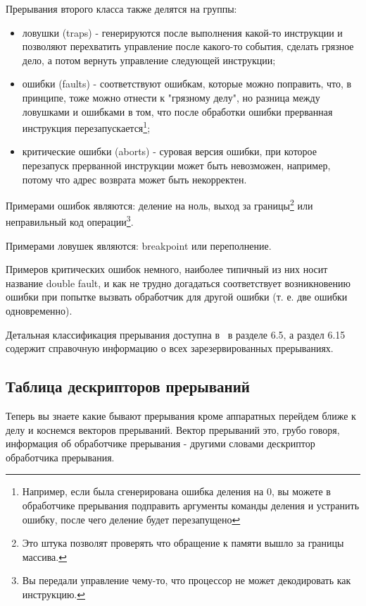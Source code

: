 Прерывания второго класса также делятся на группы:
\begin{itemize}
  \item ловушки (traps) - генерируются после выполнения какой-то инструкции и
        позволяют перехватить управление после какого-то события, сделать
        грязное дело, а потом вернуть управление следующей инструкции;
  \item ошибки (faults) - соответствуют ошибкам, которые можно поправить, что,
        в принципе, тоже можно отнести к "грязному делу", но разница между
        ловушками и ошибками в том, что после обработки ошибки прерванная
        инструкция перезапускается\footnote{Например, если была сгенерирована
        ошибка деления на 0, вы можете в обработчике прерывания подправить
        аргументы команды деления и устранить ошибку, после чего деление будет
        перезапущено};
  \item критические ошибки (aborts) - суровая версия ошибки, при которое
        перезапуск прерванной инструкции может быть невозможен, например, потому
        что адрес возврата может быть некорректен.
\end{itemize}

Примерами ошибок являются: деление на ноль, выход за границы\footnote{Это штука
позволят проверять что обращение к памяти вышло за границы массива.} или
неправильный код операции\footnote{Вы передали управление чему-то, что процессор
не может декодировать как инструкцию.}.

Примерами ловушек являются: breakpoint или переполнение.

Примеров критических ошибок немного, наиболее типичный из них носит название
double fault, и как не трудно догадаться соответствует возникновению ошибки при
попытке вызвать обработчик для другой ошибки (т. е. две ошибки одновременно).

Детальная классификация прерывания доступна в~\cite{INTEL:SYSV3} в разделе 6.5,
а раздел 6.15 содержит справочную информацию о всех зарезервированных
прерываниях.

\subsection{Таблица дескрипторов прерываний}

Теперь вы знаете какие бывают прерывания кроме аппаратных перейдем ближе к делу
и коснемся векторов прерываний. Вектор прерываний это, грубо говоря, информация
об обработчике прерывания - другими словами дескриптор обработчика прерывания.

